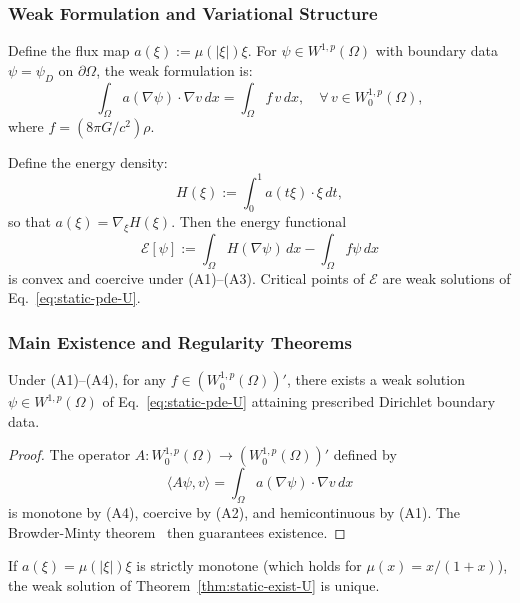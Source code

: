 \subsubsection{Weak Formulation and Variational Structure}

Define the flux map $a(\xi) := \mu(|\xi|)\xi$. For $\psi \in W^{1,p}(\Omega)$ 
with boundary data $\psi = \psi_D$ on $\partial\Omega$, the weak formulation is:
\begin{equation}\label{eq:weak-form-U}
\int_\Omega a(\nabla\psi) \cdot \nabla v\,dx = \int_\Omega f\,v\,dx, 
\quad \forall\,v \in W^{1,p}_0(\Omega),
\end{equation}
where $f = (8\pi G/c^2)\rho$.

Define the energy density:
\begin{equation}
H(\xi) := \int_0^1 a(t\xi) \cdot \xi\,dt,
\end{equation}
so that $a(\xi) = \nabla_\xi H(\xi)$. Then the energy functional
\begin{equation}
\mathcal{E}[\psi] := \int_\Omega H(\nabla\psi)\,dx - \int_\Omega f\psi\,dx
\end{equation}
is convex and coercive under (A1)--(A3). Critical points of $\mathcal{E}$ 
are weak solutions of Eq.~\eqref{eq:static-pde-U}.

\subsubsection{Main Existence and Regularity Theorems}

\begin{theorem}\label{thm:static-exist-U}
Under (A1)--(A4), for any $f \in (W^{1,p}_0(\Omega))'$, there exists a weak 
solution $\psi \in W^{1,p}(\Omega)$ of Eq.~\eqref{eq:static-pde-U} attaining 
prescribed Dirichlet boundary data.
\end{theorem}

\begin{proof}
The operator $A: W^{1,p}_0(\Omega) \to (W^{1,p}_0(\Omega))'$ defined by
\begin{equation}
\langle A\psi, v \rangle = \int_\Omega a(\nabla\psi) \cdot \nabla v\,dx
\end{equation}
is monotone by (A4), coercive by (A2), and hemicontinuous by (A1). The 
Browder-Minty theorem~\cite{Brezis} then guarantees existence.
\end{proof}

\begin{theorem}[Uniqueness]\label{thm:static-unique-U}
If $a(\xi) = \mu(|\xi|)\xi$ is strictly monotone (which holds for 
$\mu(x) = x/(1+x)$), the weak solution of Theorem~\ref{thm:static-exist-U} is unique.
\end{theorem}

